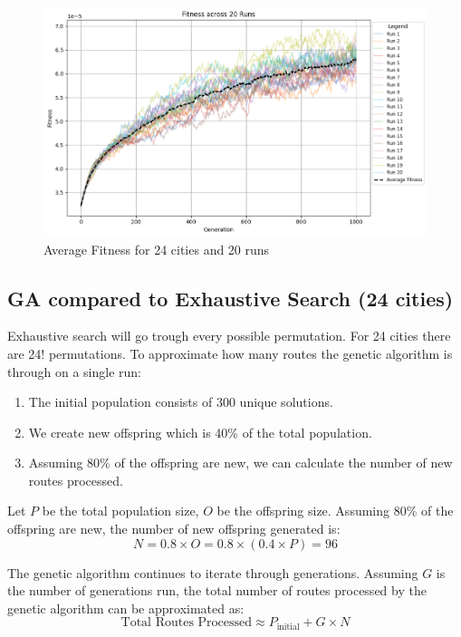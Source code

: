 \documentclass{article}
\begin{document}
    \begin{figure}[ht!]
        \includegraphics[width=12cm]{images/ga_24_cities_avg_graph.png}
        \centering
        \caption{Average Fitness for 24 cities and 20 runs}
    \end{figure}

    \newpage

    \subsection{GA compared to Exhaustive Search (24 cities)}

    Exhaustive search will go trough every possible permutation. For 24 cities there are 24! permutations. 
    To approximate how many routes the genetic algorithm is through on a single run:

    \begin{enumerate}
        \item The initial population consists of 300 unique solutions.
        \item We create new offspring which is 40\% of the total population.
        \item Assuming 80\% of the offspring are new, we can calculate the number of new routes processed.
    \end{enumerate}

    Let \(P\) be the total population size, \(O\) be the offspring size.
    Assuming 80\% of the offspring are new, the number of new offspring generated is:
    \[
    N = 0.8 \times O = 0.8 \times (0.4 \times P) = 96
    \]

    The genetic algorithm continues to iterate through generations. Assuming \(G\) is the number of generations run, the total number of routes processed by the genetic algorithm can be approximated as:
    \[
    \text{Total Routes Processed} \approx P_{\text{initial}} + G \times N
    \]
\end{document}
